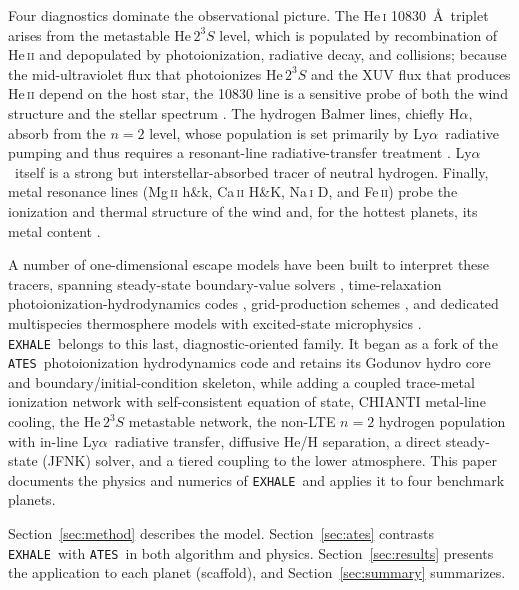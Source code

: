 \documentclass[twocolumn]{aastex702}
\newcommand{\EXHALE}{\texttt{EXHALE}}
\newcommand{\ATES}{\texttt{ATES}}
\newcommand{\HeTS}{\mathrm{He}\,2^{3}S}
\newcommand{\Lya}{\mbox{Ly}\ensuremath{\alpha}}
\newcommand{\Ha}{\mbox{H}\ensuremath{\alpha}}
\begin{document}
Four diagnostics dominate the observational picture. The \mbox{He\,\textsc{i}} 10830~\AA\
triplet arises from the metastable $\HeTS$ level, which is populated by recombination of
\mbox{He\,\textsc{ii}} and depopulated by photoionization, radiative decay, and
collisions; because the mid-ultraviolet flux that photoionizes $\HeTS$ and the XUV flux
that produces \mbox{He\,\textsc{ii}} depend on the host star, the 10830 line is a sensitive
probe of both the wind structure and the stellar spectrum
\citep{OklopcicHirata2018,Yan2022}. The hydrogen Balmer lines, chiefly \Ha, absorb from
the $n=2$ level, whose population is set primarily by \Lya\ radiative pumping and thus
requires a resonant-line radiative-transfer treatment \citep{Christie2013,Huang2017}.
\Lya\ itself is a strong but interstellar-absorbed tracer of neutral hydrogen. Finally,
metal resonance lines (\mbox{Mg\,\textsc{ii}} h\&k, \mbox{Ca\,\textsc{ii}} H\&K,
\mbox{Na\,\textsc{i}} D, and \mbox{Fe\,\textsc{ii}}) probe the ionization and thermal
structure of the wind and, for the hottest planets, its metal content
\citep{Huang2023,Koskinen2022}.

A number of one-dimensional escape models have been built to interpret these tracers,
spanning steady-state boundary-value solvers \citep{MurrayClay2009}, time-relaxation
photoionization-hydrodynamics codes \citep{Salz2016,Caldiroli2021}, grid-production
schemes \citep{Kubyshkina2018}, and dedicated multispecies thermosphere models with
excited-state microphysics \citep{Taylor2025,Taylor2026}. \EXHALE\ belongs to this last,
diagnostic-oriented family. It began as a fork of the \ATES\ photoionization
hydrodynamics code \citep{Caldiroli2021,Caldiroli2022} and retains its Godunov hydro
core and boundary/initial-condition skeleton, while adding a coupled trace-metal
ionization network with self-consistent equation of state, CHIANTI metal-line cooling,
the $\HeTS$ metastable network, the non-LTE $n=2$ hydrogen population with in-line \Lya\
radiative transfer, diffusive He/H separation, a direct steady-state (JFNK) solver, and
a tiered coupling to the lower atmosphere. This paper documents the physics and numerics
of \EXHALE\ and applies it to four benchmark planets.

Section~\ref{sec:method} describes the model. Section~\ref{sec:ates} contrasts \EXHALE\
with \ATES\ in both algorithm and physics. Section~\ref{sec:results} presents the
application to each planet (scaffold), and Section~\ref{sec:summary} summarizes.

\end{document}

